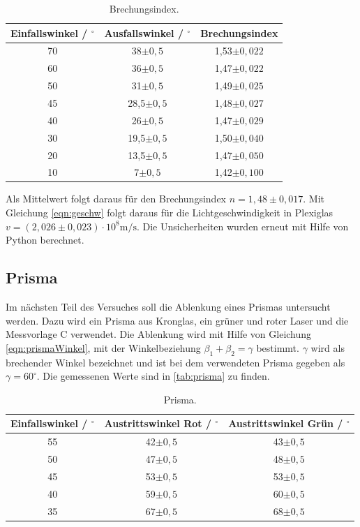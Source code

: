 \begin{table}[H]
  \centering
  \caption{Brechungsindex.}
  \label{tab:brech}
  \begin{tabular}{c c c}
    \toprule
    Einfallswinkel / $^{\circ}$ & Ausfallswinkel / $^{\circ}$ & Brechungsindex \\
    \midrule
    70 & 38$\pm 0,5$ & 1,53$\pm 0,022$\\
    60 & 36$\pm 0,5$ & 1,47$\pm 0,022$\\
    50 & 31$\pm 0,5$ & 1,49$\pm 0,025$\\
    45 & 28,5$\pm 0,5$ & 1,48$\pm 0,027$\\
    40 & 26$\pm 0,5$ & 1,47$\pm 0,029$\\
    30 & 19,5$\pm 0,5$ & 1,50$\pm 0,040$\\
    20 & 13,5$\pm 0,5$ & 1,47$\pm 0,050$\\
    10 & 7$\pm 0,5$ & 1,42$\pm 0,100$\\
    \bottomrule
  \end{tabular}
\end{table}

\noindent
Als Mittelwert folgt daraus für den Brechungsindex $n = 1,48 \pm 0,017$. Mit Gleichung \eqref{eqn:geschw} folgt daraus für die Lichtgeschwindigkeit in Plexiglas
$v = (2,026 \pm 0,023) \cdot 10^8 \si{\meter\per\second}$. Die Unsicherheiten wurden erneut mit Hilfe von Python berechnet.

\subsection{Prisma}

Im nächsten Teil des Versuches soll die Ablenkung eines Prismas untersucht werden. Dazu wird ein Prisma aus Kronglas, ein grüner und roter Laser und die Messvorlage C
verwendet. Die Ablenkung wird mit Hilfe von Gleichung \eqref{eqn:prismaWinkel}, mit der Winkelbeziehung $\beta_1 + \beta_2 = \gamma$ bestimmt. $\gamma$ wird
als brechender Winkel bezeichnet und ist bei dem verwendeten Prisma gegeben als $\gamma = 60^{\circ}$.
\newline
Die gemessenen Werte sind in \autoref{tab:prisma} zu finden.

\begin{table}[H]
  \centering
  \caption{Prisma.}
  \label{tab:prisma}
  \begin{tabular}{c c c}
    \toprule
    Einfallswinkel / $^{\circ}$ & Austrittswinkel Rot / $^{\circ}$ & Austrittswinkel Grün / $^{\circ}$\\
    \midrule
    55 & 42$\pm 0,5$ & 43$\pm 0,5$\\
    50 & 47$\pm 0,5$ & 48$\pm 0,5$\\
    45 & 53$\pm 0,5$ & 53$\pm 0,5$\\
    40 & 59$\pm 0,5$ & 60$\pm 0,5$\\
    35 & 67$\pm 0,5$ & 68$\pm 0,5$\\
    \bottomrule
  \end{tabular}
\end{table}

